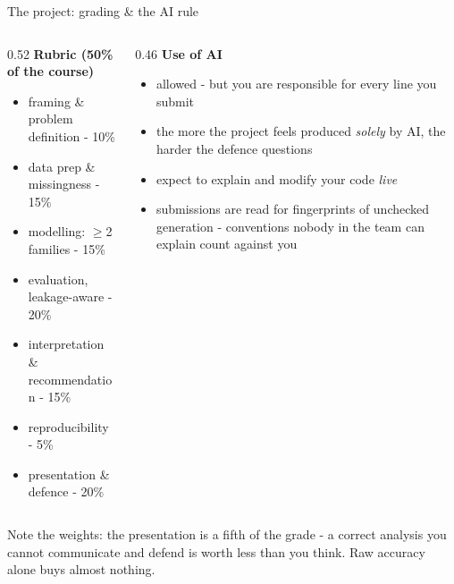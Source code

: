 \documentclass[10pt,aspectratio=169]{beamer}
\begin{document}
\begin{frame}{The project: grading \& the AI rule}
  \begin{columns}[T]
    \begin{column}{0.52\textwidth}
      \textbf{Rubric (50\% of the course)}
      \begin{itemize}\small
        \item framing \& problem definition - 10\%
        \item data prep \& missingness - 15\%
        \item modelling: $\geq$2 families - 15\%
        \item evaluation, leakage-aware - 20\%
        \item interpretation \& recommendation - 15\%
        \item reproducibility - 5\%
        \item \alert{presentation \& defence - 20\%}
      \end{itemize}
    \end{column}
    \begin{column}{0.46\textwidth}
      \textbf{Use of AI}
      \begin{itemize}\small
        \item allowed - but \alert{you are responsible for every line you
              submit}
        \item the more the project feels produced \emph{solely} by AI, the
              \alert{harder the defence questions}
        \item expect to explain and modify your code \emph{live}
        \item submissions are \alert{read for fingerprints of unchecked
              generation} - conventions nobody in the team can explain
              count against you
      \end{itemize}
    \end{column}
  \end{columns}
  \vspace{0.4em}
  \begin{center}\small
    Note the weights: the \alert{presentation is a fifth of the grade} -
    a correct analysis you cannot communicate and defend is worth less
    than you think. Raw accuracy alone buys almost nothing.
  \end{center}
\end{frame}
\end{document}
